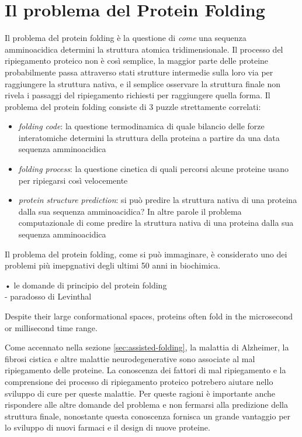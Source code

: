 \section{Il problema del Protein Folding} \label{protein-folding-problem}
{
Il problema del protein folding è la questione di \textit{come} una sequenza amminoacidica determini la struttura atomica tridimensionale. Il processo del ripiegamento proteico non è così semplice, la maggior parte delle proteine probabilmente passa attraverso stati strutture intermedie sulla loro via per raggiungere la struttura nativa, e il semplice osservare la struttura finale non rivela i passaggi del ripiegamento richiesti per raggiungere quella forma. Il problema del protein folding consiste di 3 puzzle strettamente correlati\supercite{dill2008protein}:
\begin{itemize}
	\item \textit{folding code}: la questione termodinamica di quale bilancio delle forze interatomiche determini la struttura della proteina a partire da una data sequenza amminoacidica
	
	\item \textit{folding process}: la questione cinetica di quali percorsi alcune proteine usano per ripiegarsi così velocemente
	
	\item\textit{protein structure prediction}: si può predire la struttura nativa di una proteina dalla sua sequenza amminoacidica? In altre parole il problema computazionale di come predire la struttura nativa di una proteina dalla sua sequenza amminoacidica
	
\end{itemize}	

Il problema del protein folding, come si può immaginare, è considerato uno dei problemi più imepgnativi degli ultimi 50 anni in biochimica. 

• le domande di principio del protein folding\\
- paradosso di Levinthal

 Despite their large conformational
spaces, proteins often fold in the microsecond or
millisecond time range. 

\par Come accennato nella sezione \ref{sec:assisted-folding}, la malattia di Alzheimer, la fibrosi cistica e altre malattie neurodegenerative sono associate al mal ripiegamento delle proteine. La conoscenza dei fattori di mal ripiegamento e la comprensione dei processo di ripiegamento proteico potrebero aiutare nello sviluppo di cure per queste malattie. Per queste ragioni è importante anche rispondere alle altre domande del problema e non fermarsi alla predizione della struttura finale, nonostante questa conoscenza fornisca un grande vantaggio per lo sviluppo di nuovi farmaci e il design di nuove proteine.
}
\clearpage